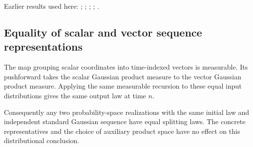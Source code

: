 \documentclass[11pt,a4paper]{report}
\begin{document}
Earlier results used here: \cite[Section~3.20.5]{LangevinLean2026ULASC}; \cite[Section~3.41.2]{LangevinLean2026ULASC}; \cite[Section~3.41.3]{LangevinLean2026ULASC}; \cite[Section~3.1.1]{LangevinLean2026IPLA}; \cite[Section~3.3.2]{LangevinLean2026IPLA}.
\subsection{\texorpdfstring{Equality of scalar and vector sequence representations}{Equality of scalar and vector sequence representations}}
\label{report-step-ProximalLangevin-SplittingGaussianLaw-lean-2}


The map grouping scalar coordinates into time-indexed vectors is measurable. Its pushforward takes the scalar Gaussian product measure to the vector Gaussian product measure. Applying the same measurable recursion to these equal input distributions gives the same output law at time \(n\).



Consequently any two probability-space realizations with the same initial law and independent standard Gaussian sequence have equal splitting laws. The concrete representatives and the choice of auxiliary product space have no effect on this distributional conclusion.
\end{document}
